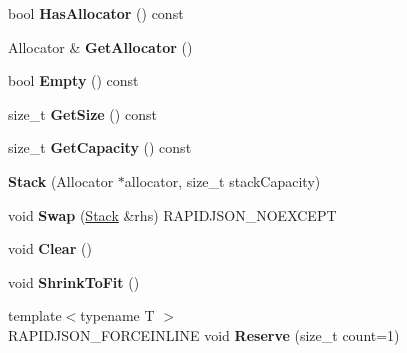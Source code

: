 \begin{DoxyCompactItemize}
\item 
bool {\bfseries Has\+Allocator} () const \hypertarget{classinternal_1_1_stack_a6cd7033d53a1da185ea6dc2e15f7234c}{}\label{classinternal_1_1_stack_a6cd7033d53a1da185ea6dc2e15f7234c}

\item 
Allocator \& {\bfseries Get\+Allocator} ()\hypertarget{classinternal_1_1_stack_ab01f693833dfe136f574d66547623cfa}{}\label{classinternal_1_1_stack_ab01f693833dfe136f574d66547623cfa}

\item 
bool {\bfseries Empty} () const \hypertarget{classinternal_1_1_stack_abf57d1c7b356d8acbbe0e79147ca4b5c}{}\label{classinternal_1_1_stack_abf57d1c7b356d8acbbe0e79147ca4b5c}

\item 
size\+\_\+t {\bfseries Get\+Size} () const \hypertarget{classinternal_1_1_stack_ade4a25fa82950619652a30aa3a807f58}{}\label{classinternal_1_1_stack_ade4a25fa82950619652a30aa3a807f58}

\item 
size\+\_\+t {\bfseries Get\+Capacity} () const \hypertarget{classinternal_1_1_stack_a61dea1ed780c07bb438d17c581ab0e48}{}\label{classinternal_1_1_stack_a61dea1ed780c07bb438d17c581ab0e48}

\item 
{\bfseries Stack} (Allocator $\ast$allocator, size\+\_\+t stack\+Capacity)\hypertarget{classinternal_1_1_stack_af09ab91f9e5143deccf7c9af837f451e}{}\label{classinternal_1_1_stack_af09ab91f9e5143deccf7c9af837f451e}

\item 
void {\bfseries Swap} (\hyperlink{classinternal_1_1_stack}{Stack} \&rhs) R\+A\+P\+I\+D\+J\+S\+O\+N\+\_\+\+N\+O\+E\+X\+C\+E\+PT\hypertarget{classinternal_1_1_stack_a5e601199a21d84b1ac612f558be0f2c3}{}\label{classinternal_1_1_stack_a5e601199a21d84b1ac612f558be0f2c3}

\item 
void {\bfseries Clear} ()\hypertarget{classinternal_1_1_stack_a02da31665a372738e81ded2f7b7d598e}{}\label{classinternal_1_1_stack_a02da31665a372738e81ded2f7b7d598e}

\item 
void {\bfseries Shrink\+To\+Fit} ()\hypertarget{classinternal_1_1_stack_a3852b8494d69c91f6a238a51572e591e}{}\label{classinternal_1_1_stack_a3852b8494d69c91f6a238a51572e591e}

\item 
{\footnotesize template$<$typename T $>$ }\\R\+A\+P\+I\+D\+J\+S\+O\+N\+\_\+\+F\+O\+R\+C\+E\+I\+N\+L\+I\+NE void {\bfseries Reserve} (size\+\_\+t count=1)\hypertarget{classinternal_1_1_stack_a7ae5de892834b7fc16099eb5e23dd97c}{}\label{classinternal_1_1_stack_a7ae5de892834b7fc16099eb5e23dd97c}


\end{DoxyCompactItemize}
